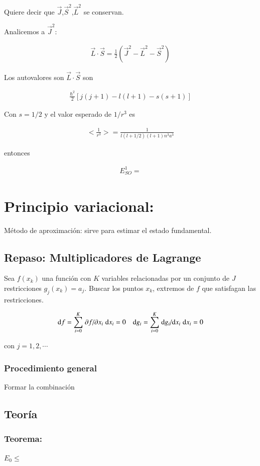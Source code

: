 Quiere decir que $\vec{J}$,$\vec{S}^2$,$\vec{L}^2$ se conservan.

Analicemos a $\vec{J}^2$:

\begin{align*}
    \vec{L}\cdot\vec{S}=\frac{1}{2}\left(\vec{J}^2-\vec{L}^2-\vec{S}^2\right)
\end{align*}

Los autovalores son $\vec{L}\cdot\vec{S}$ son

\begin{align*}
    \frac{\hbar^2}{2}\left[j(j+1)-l(l+1)-s(s+1)\right]
\end{align*}

Con $s=1/2$ y el valor esperado de $1/r^3$ es 

\begin{align*}
    < \frac{1}{r^3} > = \frac{1}{l(l+1/2)(l+1)n^3a^3}
\end{align*}


entonces

\begin{align*}
    E^1_{SO}=
\end{align*}

\section{Principio variacional:}

Método de aproximación: sirve para estimar el estado fundamental.

\subsection{Repaso: Multiplicadores de Lagrange}

Sea $f({x_k})$ una función con $K$ variables relacionadas por un conjunto de $J$ restricciones $g_j({x_k})=a_j$.
Buscar los puntos ${x_k}$, extremos de $f$ que satisfagan las restricciones.

\begin{align*}
    \dd{f}=\sum_{i=0}^K\pdv*{f}{x_i}\dd x_i = 0 && \dd g_i=\sum_{i=0}^K\dv*{g_i}{x_i}\dd x_i=0
\end{align*}

con $j=1,2,\cdots$

\subsubsection{Procedimiento general}

Formar la combinación 


\subsection{Teoría}

\subsubsection{Teorema:} $E_0\leq $

